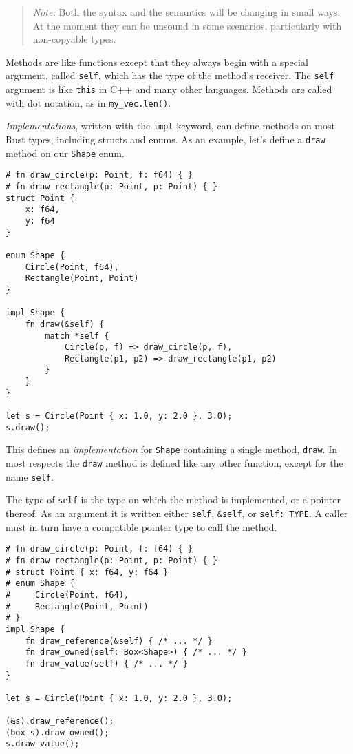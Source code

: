 \documentclass[]{article}
\begin{document}
\begin{quote}
\emph{Note:} Both the syntax and the semantics will be changing in small
ways. At the moment they can be unsound in some scenarios, particularly
with non-copyable types.
\end{quote}


Methods are like functions except that they always begin with a special
argument, called \texttt{self}, which has the type of the method's
receiver. The \texttt{self} argument is like \texttt{this} in C++ and
many other languages. Methods are called with dot notation, as in
\texttt{my\_vec.len()}.

\emph{Implementations}, written with the \texttt{impl} keyword, can
define methods on most Rust types, including structs and enums. As an
example, let's define a \texttt{draw} method on our \texttt{Shape} enum.

\begin{verbatim}
# fn draw_circle(p: Point, f: f64) { }
# fn draw_rectangle(p: Point, p: Point) { }
struct Point {
    x: f64,
    y: f64
}

enum Shape {
    Circle(Point, f64),
    Rectangle(Point, Point)
}

impl Shape {
    fn draw(&self) {
        match *self {
            Circle(p, f) => draw_circle(p, f),
            Rectangle(p1, p2) => draw_rectangle(p1, p2)
        }
    }
}

let s = Circle(Point { x: 1.0, y: 2.0 }, 3.0);
s.draw();
\end{verbatim}

This defines an \emph{implementation} for \texttt{Shape} containing a
single method, \texttt{draw}. In most respects the \texttt{draw} method
is defined like any other function, except for the name \texttt{self}.

The type of \texttt{self} is the type on which the method is
implemented, or a pointer thereof. As an argument it is written either
\texttt{self}, \texttt{\&self}, or \texttt{self: TYPE}. A caller must in
turn have a compatible pointer type to call the method.

\begin{verbatim}
# fn draw_circle(p: Point, f: f64) { }
# fn draw_rectangle(p: Point, p: Point) { }
# struct Point { x: f64, y: f64 }
# enum Shape {
#     Circle(Point, f64),
#     Rectangle(Point, Point)
# }
impl Shape {
    fn draw_reference(&self) { /* ... */ }
    fn draw_owned(self: Box<Shape>) { /* ... */ }
    fn draw_value(self) { /* ... */ }
}

let s = Circle(Point { x: 1.0, y: 2.0 }, 3.0);

(&s).draw_reference();
(box s).draw_owned();
s.draw_value();
\end{verbatim}
\end{document}
